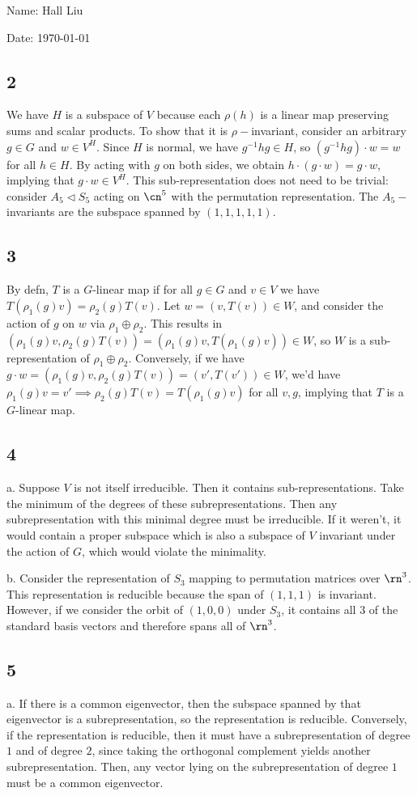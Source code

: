 \documentclass{article}
\begin{document}
Name: Hall Liu

Date: \today 
\vspace{1.5cm}
\subsection*{2}
We have $H$ is a subspace of $V$ because each $\rho(h)$ is a linear map preserving sums and scalar products. To show that it is $\rho-$invariant, consider an arbitrary $g\in G$ and $w\in V^H$. Since $H$ is normal, we have $g^{-1}hg\in H$, so $(g^{-1}hg)\cdot w=w$ for all $h\in H$. By acting with $g$ on both sides, we obtain $h\cdot(g\cdot w)=g\cdot w$, implying that $g\cdot w\in V^H$. This sub-representation does not need to be trivial: consider $A_5\triangleleft S_5$ acting on $\cn^5$ with the permutation representation. The $A_5-$invariants are the subspace spanned by $(1,1,1,1,1)$.
\subsection*{3}
By defn, $T$ is a $G$-linear map if for all $g\in G$ and $v\in V$ we have $T(\rho_1(g)v)=\rho_2(g)T(v)$. Let $w=(v,T(v))\in W$, and consider the action of $g$ on $w$ via $\rho_1\oplus\rho_2$. This results in $(\rho_1(g)v,\rho_2(g)T(v))=(\rho_1(g)v,T(\rho_1(g)v))\in W$, so $W$ is a sub-representation of $\rho_1\oplus\rho_2$. Conversely, if we have $g\cdot w=(\rho_1(g)v,\rho_2(g)T(v))=(v', T(v'))\in W$, we'd have $\rho_1(g)v=v'\implies \rho_2(g)T(v)=T(\rho_1(g)v)$ for all $v,g$, implying that $T$ is a $G$-linear map.
\subsection*{4}
a. Suppose $V$ is not itself irreducible. Then it contains sub-representations. Take the minimum of the degrees of these subrepresentations. Then any subrepresentation with this minimal degree must be irreducible. If it weren't, it would contain a proper subspace which is also a subspace of $V$ invariant under the action of $G$, which would violate the minimality.

\noindent b. Consider the representation of $S_3$ mapping to permutation matrices over $\rn^3$. This representation is reducible because the span of $(1,1,1)$ is invariant. However, if we consider the orbit of $(1,0,0)$ under $S_3$, it contains all $3$ of the standard basis vectors and therefore spans all of $\rn^3$.
\subsection*{5}
a. If there is a common eigenvector, then the subspace spanned by that eigenvector is a subrepresentation, so the representation is reducible. Conversely, if the representation is reducible, then it must have a subrepresentation of degree $1$ and of degree $2$, since taking the orthogonal complement yields another subrepresentation. Then, any vector lying on the subrepresentation of degree $1$ must be a common eigenvector. 
\end{document}
